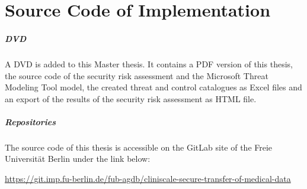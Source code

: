 \chapter{Source Code of Implementation}

\paragraph{DVD} A DVD is added to this Master thesis. It contains a PDF version of this thesis, the source code of the security risk assessment and the Microsoft Threat Modeling Tool model, the created threat and control catalogues as Excel files and an export of the results of the security risk assessment as HTML file.

\paragraph{Repositories} The source code of this thesis is accessible on the GitLab site of the Freie Universität Berlin under the link below:

\url{https://git.imp.fu-berlin.de/fub-agdb/cliniscale-secure-transfer-of-medical-data}